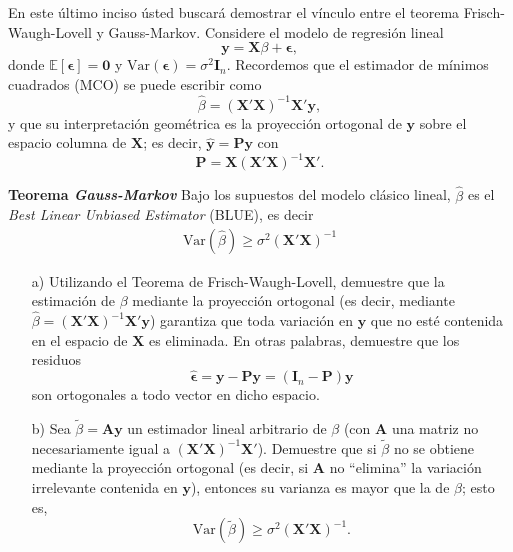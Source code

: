 \documentclass[a4paper, answers, addpoints, 11pt]{exam}
\begin{document}
\begin{enumerate}
    En este último inciso ústed buscará demostrar el vínculo entre el teorema Frisch-Waugh-Lovell y Gauss-Markov. Considere el modelo de regresión lineal
\begin{equation}\label{EQ:modeloGM}
    \mathbf{y} = \mathbf{X}\beta + \boldsymbol\epsilon,
\end{equation}
donde \(\mathbb{E}[\boldsymbol\epsilon] = \mathbf{0}\) y \(\mathrm{Var}(\boldsymbol\epsilon)=\sigma^2 \mathbf{I}_n\). Recordemos que el estimador de mínimos cuadrados (MCO) se puede escribir como
\[
\hat{\beta} = (\mathbf{X}'\mathbf{X})^{-1}\mathbf{X}'\mathbf{y},
\]
y que su interpretación geométrica es la proyección ortogonal de \(\mathbf{y}\) sobre el espacio columna de \(\mathbf{X}\); es decir, \(\hat{\mathbf{y}} = \mathbf{P}\mathbf{y}\) con
\[
\mathbf{P} = \mathbf{X}(\mathbf{X}'\mathbf{X})^{-1}\mathbf{X}'.
\]

\begin{mdframed}
\textbf{Teorema \textit{Gauss-Markov}}
Bajo los supuestos del modelo clásico lineal, \(\hat{\beta}\) es el \emph{Best Linear Unbiased Estimator} (BLUE), es decir
\begin{align}
   \text{Var}(\hat{\beta}) \geq \sigma^2 (\mathbf{X}' \mathbf{X})^{-1}    \tag{Gauss-Markov}
\end{align}
\end{mdframed}

\begin{itemize}
    \item[a)] Utilizando el Teorema de Frisch-Waugh-Lovell, demuestre que la estimación de \(\beta\) mediante la proyección ortogonal (es decir, mediante \(\hat{\beta} = (\mathbf{X}'\mathbf{X})^{-1}\mathbf{X}'\mathbf{y}\)) garantiza que toda variación en \(\mathbf{y}\) que no esté contenida en el espacio de \(\mathbf{X}\) es eliminada. En otras palabras, demuestre que los residuos
\[
\hat{\boldsymbol\epsilon} = \mathbf{y} - \mathbf{P}\mathbf{y} = (\mathbf{I}_n - \mathbf{P})\mathbf{y}
\]
son ortogonales a todo vector en dicho espacio.


    \item[b)] Sea \(\tilde{\beta} = \mathbf{A}\mathbf{y}\) un estimador lineal arbitrario de \(\beta\) (con \(\mathbf{A}\) una matriz no necesariamente igual a \((\mathbf{X}'\mathbf{X})^{-1}\mathbf{X}'\)). Demuestre que si \(\tilde{\beta}\) no se obtiene mediante la proyección ortogonal (es decir, si \(\mathbf{A}\) no ``elimina'' la variación irrelevante contenida en \(\mathbf{y}\)), entonces su varianza es mayor que la de \(\hat{\beta}\); esto es,
\[
\mathrm{Var}(\tilde{\beta}) \geq \sigma^2 (\mathbf{X}'\mathbf{X})^{-1}.
\]


\end{itemize}
\end{enumerate}
\end{document}
